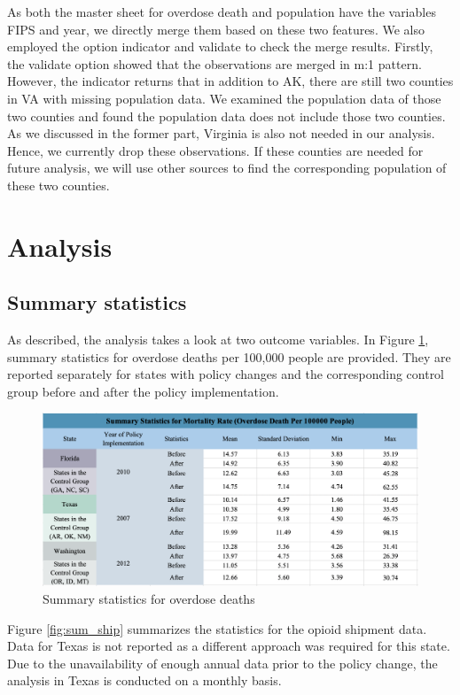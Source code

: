 \documentclass[12pt,letterpaper]{article}
\begin{document}
As both the master sheet for overdose death and population have the variables FIPS and year, we directly merge them based on these two features. We also employed the option indicator and validate to check the merge results. Firstly, the validate option showed that the observations are merged in m:1 pattern. However, the indicator returns that in addition to AK, there are still two counties in VA with missing population data. We examined the population data of those two counties and found the population data does not include those two counties. As we discussed in the former part, Virginia is also not needed in our analysis. Hence, we currently drop these observations. If these counties are needed for future analysis, we will use other sources to find the corresponding population of these two counties.

\section{Analysis}

\subsection{Summary statistics}
As described, the analysis takes a look at two outcome variables. In Figure \ref{fig:sum_deaths}, summary statistics for overdose deaths per 100,000 people are provided. They are reported separately for states with policy changes and the corresponding control group before and after the policy implementation.

\begin{figure}[!h]
  \centering
\includegraphics[width=0.7\linewidth]{../30_results/General_Results/death_statistic_analysis.png}
  \caption{Summary statistics for overdose deaths}
  \label{fig:sum_deaths}
\end{figure}  

Figure \ref{fig:sum_ship} summarizes the statistics for the opioid shipment data. Data for Texas is not reported as a different approach was required for this state. Due to the unavailability of enough annual data prior to the policy change, the analysis in Texas is conducted on a monthly basis.
\end{document}
